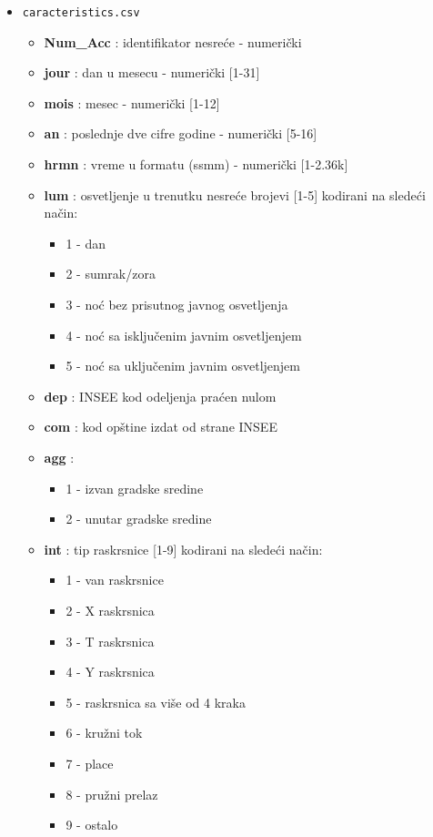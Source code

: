 \documentclass[a4paper,10pt]{article}
\begin{document}
\begin{itemize}
 \item \texttt{caracteristics.csv}
 \begin{itemize}
  \item \textbf{Num\_Acc} : identifikator nesreće - numerički
  \item \textbf{jour} : dan u mesecu - numerički [1-31]
  \item \textbf{mois} : mesec - numerički [1-12]
  \item \textbf{an} : poslednje dve cifre godine - numerički [5-16]
  \item \textbf{hrmn} : vreme u formatu (ssmm) - numerički [1-2.36k]
  \item \textbf{lum} : osvetljenje u trenutku nesreće brojevi [1-5] kodirani na sledeći način:
			\begin{itemize}
			 \item 1 - dan
			 \item 2 - sumrak/zora
			 \item 3 - noć bez prisutnog javnog osvetljenja
			 \item 4 - noć sa isključenim javnim osvetljenjem
			 \item 5 - noć sa uključenim javnim osvetljenjem
			\end{itemize}
  \item \textbf{dep} : INSEE kod odeljenja praćen nulom %
  \item \textbf{com} : kod opštine izdat od strane INSEE
  \item \textbf{agg} : \begin{itemize} %
                        \item 1 - izvan gradske sredine
                        \item 2 - unutar gradske sredine
                       \end{itemize}
  \item \textbf{int} : tip raskrsnice [1-9] kodirani na sledeći način:
			\begin{itemize}
			 \item 1 - van raskrsnice
			 \item 2 - X raskrsnica
			 \item 3 - T raskrsnica
			 \item 4 - Y raskrsnica
			 \item 5 - raskrsnica sa više od 4 kraka
			 \item 6 - kružni tok
			 \item 7 - place %
			 \item 8 - pružni prelaz
			 \item 9 - ostalo
			 

\end{itemize}
\end{itemize}
\end{itemize}
\end{document}
